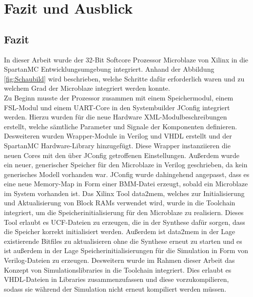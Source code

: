 \chapter{Fazit und Ausblick}
\section{Fazit}
In dieser Arbeit wurde der 32-Bit Softcore Prozessor Microblaze von Xilinx in die SpartanMC Entwicklungsumgebung integriert. Anhand der Abbildung \ref{fig:Schaubild} wird beschrieben, welche Schritte dafür erforderlich waren und zu welchem Grad der Microblaze integriert werden konnte.\\
Zu Beginn musste der Prozessor zusammen mit einem Speichermodul, einem FSL-Modul und einem UART-Core in den Systembuilder JConfig integriert werden. Hierzu wurden für die neue Hardware XML-Modulbeschreibungen erstellt, welche sämtliche Parameter und Signale der Komponenten definieren. Desweiteren wurden Wrapper-Module in Verilog und VHDL erstellt und der SpartanMC Hardware-Library hinzugefügt. Diese Wrapper instanziieren die neuen Cores mit den über JConfig getroffenen Einstellungen. Außerdem wurde ein neuer, generischer Speicher für den Microblaze in Verilog geschrieben, da kein generisches Modell vorhanden war. JConfig wurde dahingehend angepasst, dass es eine neue Memory-Map in Form einer BMM-Datei erzeugt, sobald ein Microblaze im System vorhanden ist. Das Xilinx Tool data2mem, welches zur Initialisierung und Aktualisierung von Block RAMs verwendet wird, wurde in die Toolchain integriert, um die Speicherinitialisierung für den Microblaze zu realisiern. Dieses Tool erlaubt es UCF-Dateien zu erzeugen, die in der Synthese dafür sorgen, dass die Speicher korrekt initialisiert werden. Außerdem ist data2mem in der Lage existierende Bitfiles zu aktualisieren ohne die Synthese erneut zu starten und es ist außerdem in der Lage Speicherinitialisierungen für die Simulation in Form von Verilog-Dateien zu erzeugen. Desweitern wurde im Rahmen dieser Arbeit das Konzept von Simulationslibraries in die Toolchain integriert. Dies erlaubt es VHDL-Dateien in Libraries zusammenzufassen und diese vorzukompilieren, sodass sie während der Simulation nicht erneut kompiliert werden müssen.\\
